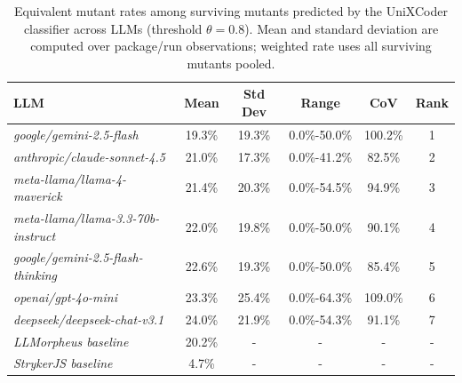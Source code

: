 \begin{table}
\centering
{\scriptsize
\begin{tabular}{l||c|c|c|c||c}
\textbf{LLM} & \textbf{Mean} & \textbf{Std Dev} & \textbf{Range} & \textbf{CoV} & \textbf{Rank} \\
\hline\hline
\textit{google/gemini-2.5-flash} & 19.3\% & 19.3\% & 0.0\%-50.0\% & 100.2\% & 1 \\
\textit{anthropic/claude-sonnet-4.5} & 21.0\% & 17.3\% & 0.0\%-41.2\% & 82.5\% & 2 \\
\textit{meta-llama/llama-4-maverick} & 21.4\% & 20.3\% & 0.0\%-54.5\% & 94.9\% & 3 \\
\textit{meta-llama/llama-3.3-70b-instruct} & 22.0\% & 19.8\% & 0.0\%-50.0\% & 90.1\% & 4 \\
\textit{google/gemini-2.5-flash-thinking} & 22.6\% & 19.3\% & 0.0\%-50.0\% & 85.4\% & 5 \\
\textit{openai/gpt-4o-mini} & 23.3\% & 25.4\% & 0.0\%-64.3\% & 109.0\% & 6 \\
\textit{deepseek/deepseek-chat-v3.1} & 24.0\% & 21.9\% & 0.0\%-54.3\% & 91.1\% & 7 \\
\hline
\textit{LLMorpheus baseline} & 20.2\% & - & - & - & - \\
\textit{StrykerJS baseline} & 4.7\% & - & - & - & - \\
\end{tabular}
}
\caption{Equivalent mutant rates among surviving mutants predicted by the UniXCoder classifier across LLMs (threshold $\theta=0.8$). Mean and standard deviation are computed over package/run observations; weighted rate uses all surviving mutants pooled.}
\label{tab:llm-equiv-main}
\end{table}
